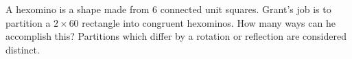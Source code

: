 A hexomino is a shape made from $6$ connected unit squares. Grant's job is to partition a $2\times 60$ rectangle into congruent hexominos. How many ways can he accomplish this? Partitions which differ by a rotation or reflection are considered distinct.
